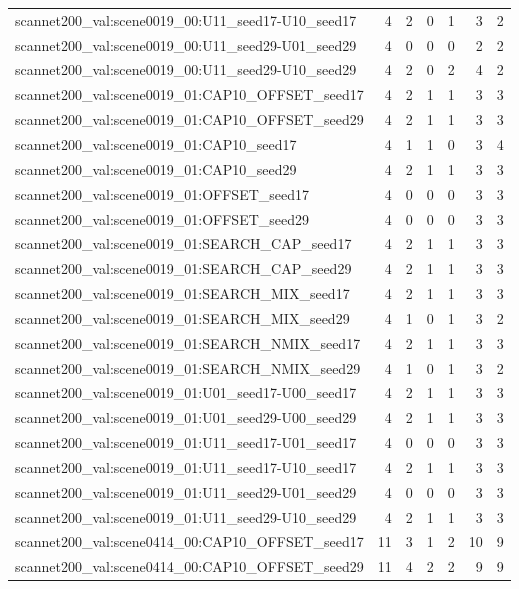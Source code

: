 \begin{table}[t]
\begin{tabular}{lrrrrrr}
scannet200\_val:scene0019\_00:U11\_seed17-U10\_seed17 & 4 & 2 & 0 & 1 & 3 & 2 \\
scannet200\_val:scene0019\_00:U11\_seed29-U01\_seed29 & 4 & 0 & 0 & 0 & 2 & 2 \\
scannet200\_val:scene0019\_00:U11\_seed29-U10\_seed29 & 4 & 2 & 0 & 2 & 4 & 2 \\
scannet200\_val:scene0019\_01:CAP10\_OFFSET\_seed17 & 4 & 2 & 1 & 1 & 3 & 3 \\
scannet200\_val:scene0019\_01:CAP10\_OFFSET\_seed29 & 4 & 2 & 1 & 1 & 3 & 3 \\
scannet200\_val:scene0019\_01:CAP10\_seed17 & 4 & 1 & 1 & 0 & 3 & 4 \\
scannet200\_val:scene0019\_01:CAP10\_seed29 & 4 & 2 & 1 & 1 & 3 & 3 \\
scannet200\_val:scene0019\_01:OFFSET\_seed17 & 4 & 0 & 0 & 0 & 3 & 3 \\
scannet200\_val:scene0019\_01:OFFSET\_seed29 & 4 & 0 & 0 & 0 & 3 & 3 \\
scannet200\_val:scene0019\_01:SEARCH\_CAP\_seed17 & 4 & 2 & 1 & 1 & 3 & 3 \\
scannet200\_val:scene0019\_01:SEARCH\_CAP\_seed29 & 4 & 2 & 1 & 1 & 3 & 3 \\
scannet200\_val:scene0019\_01:SEARCH\_MIX\_seed17 & 4 & 2 & 1 & 1 & 3 & 3 \\
scannet200\_val:scene0019\_01:SEARCH\_MIX\_seed29 & 4 & 1 & 0 & 1 & 3 & 2 \\
scannet200\_val:scene0019\_01:SEARCH\_NMIX\_seed17 & 4 & 2 & 1 & 1 & 3 & 3 \\
scannet200\_val:scene0019\_01:SEARCH\_NMIX\_seed29 & 4 & 1 & 0 & 1 & 3 & 2 \\
scannet200\_val:scene0019\_01:U01\_seed17-U00\_seed17 & 4 & 2 & 1 & 1 & 3 & 3 \\
scannet200\_val:scene0019\_01:U01\_seed29-U00\_seed29 & 4 & 2 & 1 & 1 & 3 & 3 \\
scannet200\_val:scene0019\_01:U11\_seed17-U01\_seed17 & 4 & 0 & 0 & 0 & 3 & 3 \\
scannet200\_val:scene0019\_01:U11\_seed17-U10\_seed17 & 4 & 2 & 1 & 1 & 3 & 3 \\
scannet200\_val:scene0019\_01:U11\_seed29-U01\_seed29 & 4 & 0 & 0 & 0 & 3 & 3 \\
scannet200\_val:scene0019\_01:U11\_seed29-U10\_seed29 & 4 & 2 & 1 & 1 & 3 & 3 \\
scannet200\_val:scene0414\_00:CAP10\_OFFSET\_seed17 & 11 & 3 & 1 & 2 & 10 & 9 \\
scannet200\_val:scene0414\_00:CAP10\_OFFSET\_seed29 & 11 & 4 & 2 & 2 & 9 & 9 \\

\end{tabular}
\end{table}
